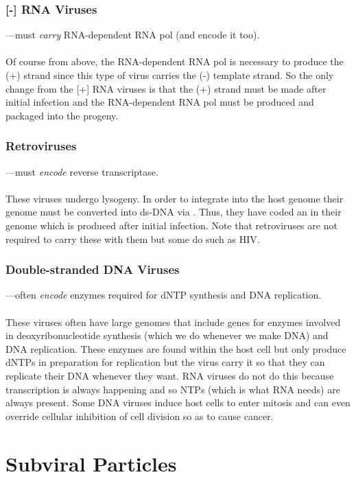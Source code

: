 \documentclass[../Bio_chemistryReview.tex]{subfiles}
\begin{document}
\subsubsection{[-] RNA Viruses}
---must \textit{carry} RNA-dependent RNA pol (and encode it too).\\
\hfil\\
\noindent Of course from above, the RNA-dependent RNA pol is necessary to
produce the (+) strand since this type of virus carries the (-) template strand.
So the only change from the [+] RNA viruses is that the (+) strand must be made
after initial infection and the RNA-dependent RNA pol must be produced and
packaged into the progeny.

\subsubsection{Retroviruses}
---must \textit{encode} reverse transcriptase.\\
\hfil\\
\noindent These viruses undergo lysogeny. In order to integrate into the host
genome their genome must be converted into ds-DNA via . Thus, they have coded an  in
their genome which is produced after initial infection. Note that retroviruses
are not required to carry these with them but some do such as HIV.

\subsubsection{Double-stranded DNA Viruses}
---often \textit{encode} enzymes required for dNTP synthesis and DNA
replication.\\
\hfil \\
\noindent These viruses often have large genomes that include genes for enzymes
involved in deoxyribonucleotide synthesis (which we do whenever we make DNA) and
DNA replication. These enzymes are found within the host cell but only produce
dNTPs in preparation for replication but the virus carry it so that they can
replicate their DNA whenever they want. RNA viruses do not do this because
transcription is always happening and so NTPs (which is what RNA needs) are
always present. Some DNA viruses induce host cells to enter mitosis and can even
override cellular inhibition of cell division so as to cause cancer.

\section{Subviral Particles}
\end{document}
